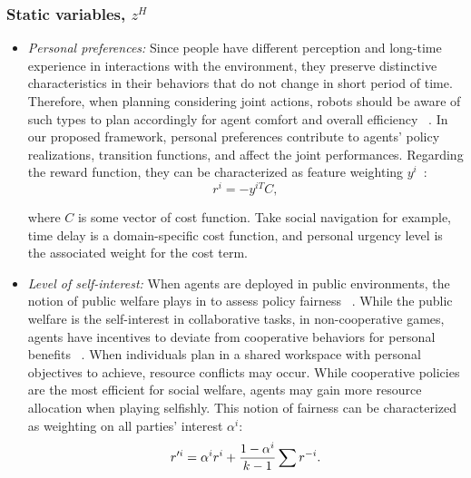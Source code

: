 \documentclass[letterpaper, 10 pt, conference]{ieeeconf}  %
\begin{document}
\subsubsection{Static variables, $z^H$}

\begin{itemize}
	\item \textit{Personal preferences:} Since people have different perception and long-time experience in interactions with the environment, they preserve distinctive characteristics in their behaviors that do not change in short period of time. Therefore, when planning considering joint actions, robots should be aware of such types to plan accordingly for agent comfort and overall efficiency ~\cite{gombolay2015coordination}. In our proposed framework, personal preferences contribute to agents' policy realizations, transition functions, and affect the joint performances. Regarding the reward function, they can be characterized as feature weighting $y^i$~\cite{dorsa2017active}:
	\begin{equation}
	r^i = -y^{iT}C, 
	\end{equation}
	
	where $C$ is some vector of cost function. Take social navigation for 
    example, time delay is a domain-specific cost function, and personal 
    urgency level is the associated weight for the cost term.
	\item \textit{Level of self-interest:} When agents are deployed in public environments, the notion of public welfare plays in to assess policy fairness ~\cite{fehr2004social}. While the public welfare is the self-interest in collaborative tasks, in non-cooperative games, agents have incentives to deviate from cooperative behaviors for personal benefits ~\cite{fujiwara2015non}. When individuals plan in a shared workspace with personal objectives to achieve, resource conflicts may occur. 
	While cooperative policies are the most efficient for social welfare, agents may gain more resource allocation when playing selfishly. This notion of fairness can be characterized as weighting on all parties' interest $\alpha^i$:
	\begin{equation}
	r'^{i} = \alpha^ir^i+ \small{\frac{1-\alpha^i}{k-1}}\sum r^{-i}.
	\end{equation}
	
\end{itemize}
\end{document}
